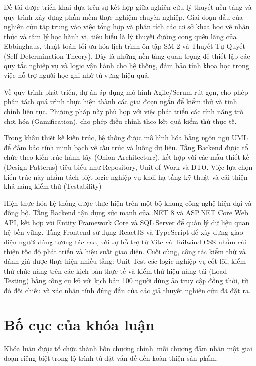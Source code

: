 Đề tài được triển khai dựa trên sự kết hợp giữa nghiên cứu lý thuyết nền tảng và quy trình xây dựng phần mềm thực nghiệm chuyên nghiệp. Giai đoạn đầu của nghiên cứu tập trung vào việc tổng hợp và phân tích các cơ sở khoa học về nhận thức và tâm lý học hành vi, tiêu biểu là lý thuyết đường cong quên lãng của Ebbinghaus, thuật toán tối ưu hóa lịch trình ôn tập SM-2 và Thuyết Tự Quyết (Self-Determination Theory). Đây là những nền tảng quan trọng để thiết lập các quy tắc nghiệp vụ và logic vận hành cho hệ thống, đảm bảo tính khoa học trong việc hỗ trợ người học ghi nhớ từ vựng hiệu quả.

Về quy trình phát triển, dự án áp dụng mô hình Agile/Scrum rút gọn, cho phép phân tách quá trình thực hiện thành các giai đoạn ngắn để kiểm thử và tinh chỉnh liên tục. Phương pháp này phù hợp với việc phát triển các tính năng trò chơi hóa (Gamification), cho phép điều chỉnh theo kết quả kiểm thử thực tế.

Trong khâu thiết kế kiến trúc, hệ thống được mô hình hóa bằng ngôn ngữ UML để đảm bảo tính minh bạch về cấu trúc và luồng dữ liệu. Tầng Backend được tổ chức theo kiến trúc hành tây (Onion Architecture), kết hợp với các mẫu thiết kế (Design Patterns) tiêu biểu như Repository, Unit of Work và DTO. Việc lựa chọn kiến trúc này nhằm tách biệt logic nghiệp vụ khỏi hạ tầng kỹ thuật và cải thiện khả năng kiểm thử (Testability).

Hiện thực hóa hệ thống được thực hiện trên một bộ khung công nghệ hiện đại và đồng bộ. Tầng Backend tận dụng sức mạnh của .NET 8 và ASP.NET Core Web API, kết hợp với Entity Framework Core và SQL Server để quản lý dữ liệu quan hệ bền vững. Tầng Frontend sử dụng ReactJS và TypeScript để xây dựng giao diện người dùng tương tác cao, với sự hỗ trợ từ Vite và Tailwind CSS nhằm cải thiện tốc độ phát triển và hiệu suất giao diện. Cuối cùng, công tác kiểm thử và đánh giá được thực hiện nhiều tầng: Unit Test các logic nghiệp vụ cốt lõi, kiểm thử chức năng trên các kịch bản thực tế và kiểm thử hiệu năng tải (Load Testing) bằng công cụ k6 với kịch bản 100 người dùng ảo truy cập đồng thời, từ đó đối chiếu và xác nhận tính đúng đắn của các giả thuyết nghiên cứu đã đặt ra.

\section{Bố cục của khóa luận}

Khóa luận được tổ chức thành bốn chương chính, mỗi chương đảm nhận một giai đoạn riêng biệt trong lộ trình từ đặt vấn đề đến hoàn thiện sản phẩm.

